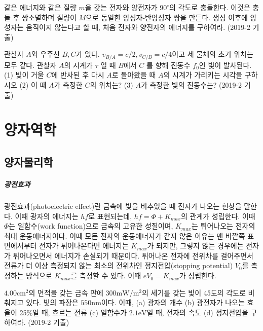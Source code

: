 \begin{problem}
같은 에너지와 같은 질량 $m$을 갖는 전자와 양전자가 $90^\circ$의 각도로 충돌한다. 이것은 충돌 후 쌍소멸하며 질량이 $M$으로 동일한 양성자-반양성자 쌍을 만든다. 생성 이후에 양성자는 움직이지 않는다고 할 때, 처음 전자와 양전자의 에너지를 구하여라. (2019-2 기출)
\end{problem}

\begin{problem}
관찰자 $A$와 우주선 $B, C$가 있다. $v_{B/A}= c/2, v_{C/B}=c/4$이고 세 물체의 초기 위치는 모두 같다. 관찰자 $A$의 시계가 $\tau$ 일 때 $B$에서 $C$ 를 향해 진동수 $f_0$인 빛이 발사된다. 
(1)	빛이 거울 $C$에 반사된 후 다시 $A$로 돌아왔을 때 $A$의 시계가 가리키는 시각을 구하시오
(2)	이 때 $A$가 측정한 $C$의 위치는?
(3)	$A$가 측정한 빛의 진동수는? (2019-2 기출)
\end{problem}


\chapter{양자역학}
\section{양자물리학}
\paragraph{광전효과}
광전효과(photoelectric effect)란 금속에 빛을 비추었을 때 전자가 나오는 현상을 말한다. 이때 광자의 에너지는 $hf$로 표현되는데, $hf=\Phi+K_{max}$의 관계가 성립한다. 이때 $\Phi$는 일함수(work function)으로 금속의 고유한 성질이며, $K_{max}$는 튀어나오는 전자의 최대 운동에너지이다. 이때 모든 전자의 운동에너지가 같지 않은 이유는 맨 바깥쪽 표면에서부터 전자가 튀어나온다면 에너지는 $K_{max}$가 되지만, 그렇지 않는 경우에는 전자가 튀어나오면서 에너지가 손실되기 때문이다. 튀어나온 전자에 전위차를 걸어주면서 전류가 더 이상 측정되지 않는 최소의 전위차인 정지전압(stopping potential) $V_0$를 측정하는 방식으로 $K_{max}$를 측정할 수 있다. 이때 $eV_0=K_{max}$가 성립한다.
\begin{exercise}
$4.00\mathrm{cm^2}$의 면적을 갖는 금속 판에 $300\mathrm{mW/m^2}$의 세기를 갖는 빛이 45도의 각도로 비춰지고 있다. 빛의 파장은 $550\mathrm{nm}$이다. 이때,
(a)	광자의 개수
(b)	광전자가 나오는 효율이 25\%일 때, 흐르는 전류
(c)	일함수가 $2.1\mathrm{eV}$일 때, 전자의 속도
(d)	정지전압을 구하여라. (2019-2 기출)
\end{exercise}

